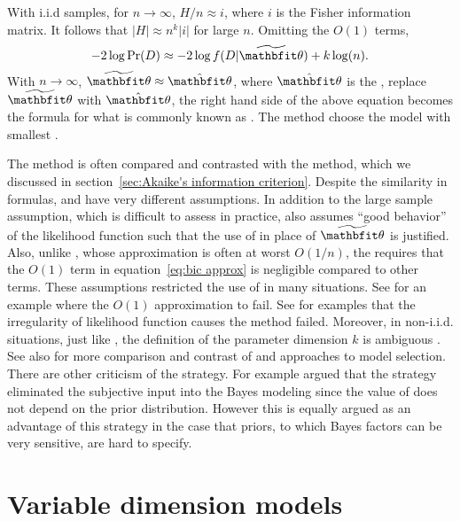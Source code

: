 With i.i.d samples, for $n\to\infty$, $H/n \approx i$, where $i$ is the Fisher
information matrix. It follows that $\lvert H \rvert \approx n^k \lvert i
\rvert$ for large $n$. Omitting the $O(1)$ terms,
\begin{equation}
  -2\log\Pr(D) \approx -2\log f(D|\tbth) + k\log(n).
\end{equation}
With $n\to\infty$, $\tbth\approx\hat{\bth}$, where $\hat{\bth}$ is the \mle,
replace $\tbth$ with $\hat{\bth}$, the right hand side of the above equation
becomes the formula for what is commonly known as \bic. The \bic method choose
the model with smallest \bic.

The \bic method is often compared and contrasted with the \aic method, which
we discussed in section~\ref{sec:Akaike's information criterion}. Despite the
similarity in formulas, \aic and \bic have very different assumptions. In
addition to the large sample assumption, which is difficult to assess in
practice, \bic also assumes ``good behavior'' of the likelihood function such
that the use of \mle in place of $\tbth$ is justified. Also, unlike \aic,
whose approximation is often at worst $O(1/n)$, the \bic requires that the
$O(1)$ term in equation~\eqref{eq:bic approx} is negligible compared to other
terms. These assumptions restricted the use of \bic in many situations. See
\textcite{Gelfand1994} for an example where the $O(1)$ approximation to fail.
See \textcite{Berger2001} for examples that the irregularity of likelihood
function causes the \bic method failed. Moreover, in non-i.i.d. situations,
just like \aic, the definition of the parameter dimension $k$ is ambiguous
\parencite{Spiegelhalter1998, Kass1995}. See also \textcite[][chap.~5 and
chap.~6]{Burnham2002} for more comparison and contrast of \aic and \bic
approaches to model selection. There are other criticism of the \bic strategy.
For example \textcite[][chap.~7]{Robert2007} argued that the \bic strategy
eliminated the subjective input into the Bayes modeling since the value of
\bic does not depend on the prior distribution. However this is equally argued
as an advantage of this strategy in the case that priors, to which Bayes
factors can be very sensitive, are hard to specify.

\section{Variable dimension models}
\label{sec:Variable dimension models}

